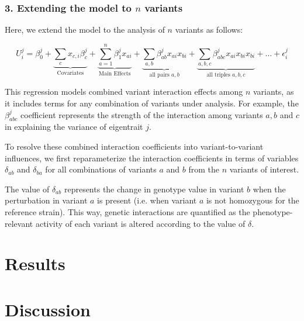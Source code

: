 \documentclass[letterpaper, 12pt]{article}
\begin{document}
\subsubsection*{3. Extending the model to $n$ variants}

Here, we extend the model to the analysis of $n$ variants as follows:

\begin{equation}
U^{j}_{i} = \beta^{j}_{0} + \underbrace{\sum_{c}x_{c,i}\beta_{c}^j}_{\text{Covariates}} +  \underbrace{\sum_{a=1}^{n}\beta^{j}_{1}x_{ai}}_{\text{Main Effects}} + \underbrace{\sum_{a,b}\beta^{j}_{ab}x_{ai}x_{bi}}_{\text{all pairs }a,b} + \underbrace{\sum_{a,b,c}\beta^{j}_{abc}x_{ai}x_{bi}x_{bi}}_{\text{all triples }a,b,c} + \ldots + \epsilon^{j}_{i}
\end{equation}

This regression models combined variant interaction effects among $n$ variants, as it includes terms for any combination of variants under analysis. For example, the $\beta_{abc}^j$ coefficient represents the strength of the interaction among variants $a,b$ and $c$ in explaining the variance of eigentrait $j$.

To resolve these combined interaction coefficients into variant-to-variant influences, we first reparameterize the interaction coefficients in terms of variables $\delta_{ab}$ and $\delta_{ba}$ for all combinations of variants $a$ and $b$ from the $n$ variants of interest.

The value of $\delta_{ab}$ represents the change in genotype value in variant $b$ when the perturbation in variant $a$ is present (i.e. when variant $a$ is not homozygous for the reference strain). This way, genetic interactions are quantified as the phenotype-relevant activity of each variant is altered according to the value of $\delta$.

\section*{Results}

\section*{Discussion}

\newpage



\end{document}

